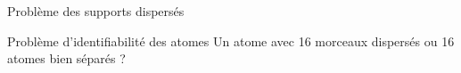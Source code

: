 \begin{frame}{Problème des supports dispersés}
\begin{figure}\centering
\end{figure}
\begin{alertblock}{Problème d'identifiabilité des atomes}
Un atome avec 16 morceaux dispersés \alert{ou} 16 atomes bien séparés ?
\end{alertblock}
\end{frame}

